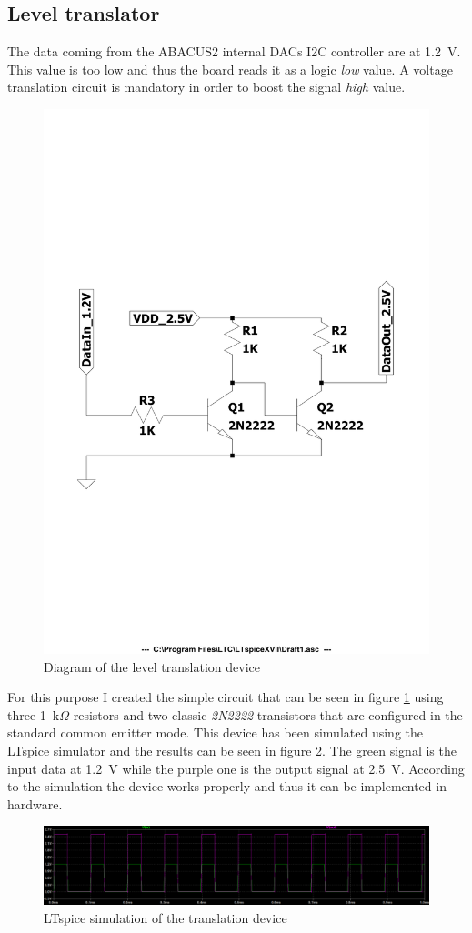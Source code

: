 \subsection{Level translator}\label{leveltranslator}
The data coming from the ABACUS2 internal DACs I2C controller are at 1.2~V. This value is too low and thus the board reads it as a logic \textit{low} value. A voltage translation circuit is mandatory in order to boost the signal \textit{high} value.
\begin{figure}[H]
	\centering
	\includegraphics[width=0.6\linewidth]{IMG/ch5/DIAGRAM}
	\caption{Diagram of the level translation device}
	\label{fig:diagram}
\end{figure}
\noindent For this purpose I created the simple circuit that can be seen in figure \ref{fig:diagram} using three 1~k$\Omega$ resistors and two classic \textit{2N2222} transistors that are configured in the standard common emitter mode.
This device has been simulated using the LTspice simulator and the results can be seen in figure \ref{fig:transsimulation}.
The green signal is the input data at 1.2~V while the purple one is the output signal at 2.5~V.
According to the simulation the device works properly and thus it can be implemented in hardware.
\begin{figure}[H]
	\centering
	\includegraphics[width=1\linewidth]{IMG/ch5/TRANSSIMULATION}
	\caption{LTspice simulation of the translation device}
	\label{fig:transsimulation}
\end{figure}
